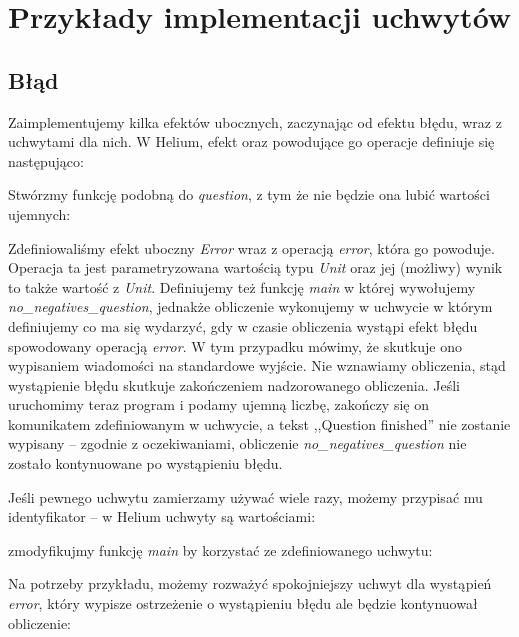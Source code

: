\section{Przykłady implementacji uchwytów}

\subsection{Błąd}

Zaimplementujemy kilka efektów ubocznych, zaczynając od efektu błędu, wraz z uchwytami dla nich. W Helium, efekt oraz powodujące go operacje definiuje się następująco:



Stwórzmy funkcję podobną do \textit{question}, z tym że nie będzie ona lubić wartości ujemnych:



Zdefiniowaliśmy efekt uboczny \textit{Error} wraz z operacją \textit{error}, która go powoduje. Operacja ta jest parametryzowana wartością typu \textit{Unit} oraz jej (możliwy) wynik to także wartość z \textit{Unit}. Definiujemy też funkcję \textit{main} w której wywołujemy \textit{no\_negatives\_question}, jednakże obliczenie wykonujemy w uchwycie w którym definiujemy co ma się wydarzyć, gdy w czasie obliczenia wystąpi efekt błędu spowodowany operacją \textit{error}. W tym przypadku mówimy, że skutkuje ono wypisaniem wiadomości na standardowe wyjście. Nie wznawiamy obliczenia, stąd wystąpienie błędu skutkuje zakończeniem nadzorowanego obliczenia. Jeśli uruchomimy teraz program i podamy ujemną liczbę, zakończy się on komunikatem zdefiniowanym w uchwycie, a tekst ,,Question finished'' nie zostanie wypisany -- zgodnie z oczekiwaniami, obliczenie \textit{no\_negatives\_question} nie zostało kontynuowane po wystąpieniu błędu.

Jeśli pewnego uchwytu zamierzamy używać wiele razy, możemy przypisać mu identyfikator -- w Helium uchwyty są wartościami:



zmodyfikujmy funkcję \textit{main} by korzystać ze zdefiniowanego uchwytu:



Na potrzeby przykładu, możemy rozważyć spokojniejszy uchwyt dla wystąpień \textit{error}, który wypisze ostrzeżenie o wystąpieniu błędu ale będzie kontynuował obliczenie:

